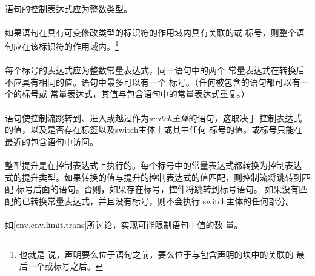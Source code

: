 {                                       
\constraint
\paragraph{}
语句的控制表达式应为整数类型。

\paragraph{}
如果语句在具有可变修改类型的标识符的作用域内具有关联的或
标号，则整个语句应在该标识符的作用域内。\footnote{也就是
说，声明要么位于语句之前，要么位于与包含声明的块中的关联的
最后一个或标号之后。}

\paragraph{}
每个标号的表达式应为整数常量表达式，同一语句中的两个
常量表达式在转换后不应具有相同的值。语句中最多可以有一个
标号。（任何被包含的语句都可以有一个的标号或
常量表达式，其值与包含语句中的常量表达式重复。）

\semantic
\paragraph{}
语句使控制流跳转到、进入或越过作为\textit{switch主体}的语句，这取决于
控制表达式的值，以及是否存在标签以及switch主体上或其中任何
标号的值。或标号只能在最近的包含语句中访问。

\paragraph{}
整型提升是在控制表达式上执行的。每个标号中的常量表达式都转换为控制表达
式的提升类型。如果转换的值与提升的控制表达式的值匹配，则控制流将跳转到匹配
标号后面的语句。否则，如果存在标号，控件将跳转到标号语句。
如果没有匹配的已转换常量表达式，并且没有标号，则不会执行
switch主体的任何部分。

\implimit
\paragraph{}
如\ref{env.env.limit.trans}所讨论，实现可能限制语句中值的数
量。

}
